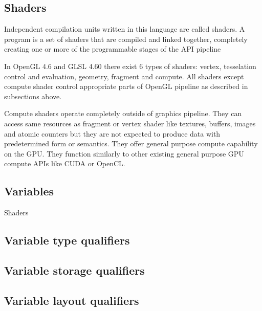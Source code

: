 \subsection*{Shaders}

Independent compilation units written in this language are called shaders. A program is a set of
shaders that are compiled and linked together, completely creating one or more of the
programmable stages of the API pipeline %

In OpenGL 4.6 and GLSL 4.60 there exist 6 types of shaders: vertex, tesselation control and evaluation, geometry, fragment and compute.
All shaders except compute shader control appropriate parts of OpenGL pipeline as described in subsections above. 

Compute shaders operate completely outside of graphics pipeline. They can access same resources as fragment or vertex shader like textures, buffers, images and atomic counters
but they are not expected to produce data with predetermined form or semantics. They offer general purpose compute capability on the GPU. 
They function similarly to other existing general purpose GPU compute APIs like CUDA or OpenCL.

\subsection{Variables}

Shaders 

\subsection{Variable type qualifiers}


\subsection{Variable storage qualifiers}


\subsection{Variable layout qualifiers}

